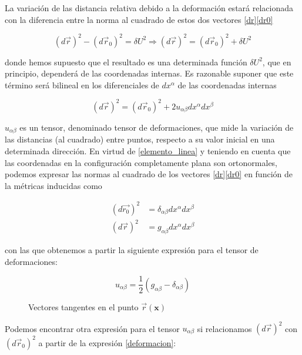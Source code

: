 La variación de las distancia relativa debido a la deformación estará
relacionada con la diferencia entre la norma al cuadrado de estos dos vectores
\eqref{dr}\eqref{dr0}

\begin{equation}
(d\vec{r})^2-(d\vec{r}_0)^2=\delta U^2\Rightarrow (d\vec{r})^2=(d\vec{r}_0)^2+\delta U^2
\end{equation}
 
donde hemos supuesto que el resultado es una determinada función $\delta U^2$,
que en principio, dependerá de las coordenadas internas. Es razonable suponer
que este término será bilineal en los diferenciales de $dx^{\alpha}$ de las
coordenadas internas 

\begin{equation}\label{drU}
(d\vec{r})^2=(d\vec{r}_0)^2+2u_{\alpha\beta}dx^{\alpha}dx^{\beta}
\end{equation}
 
$u_{\alpha\beta}$ es un tensor, denominado tensor de deformaciones, que mide
la variación de las distancias (al cuadrado) entre puntos, respecto a su valor
inicial en una determinada dirección. En virtud de \eqref{elemento_linea} y
teniendo en cuenta que las coordenadas en la configuración completamente plana
son ortonormales, podemos expresar las normas al cuadrado de los vectores
\eqref{dr}\eqref{dr0} en función de la métricas inducidas como

\begin{align*}
(d\vec{r_0})^2&=\delta_{\alpha\beta}dx^{\alpha}dx^{\beta}\\
(d\vec{r})^2&=g_{\alpha\beta}dx^{\alpha}dx^{\beta}
\end{align*}

con las que obtenemos a partir \label{drU} la siguiente expresión para el
tensor de deformaciones:

\begin{equation}
u_{\alpha\beta}=\frac{1}{2}\left(g_{\alpha\beta} - \delta_{\alpha\beta}\right)
\end{equation}


\begin{figure}[h]
\centering
 
\caption{Vectores tangentes en el punto $\vec{r}(\mathbf{x})$}
\end{figure}

Podemos encontrar otra expresión para el tensor $u_{\alpha\beta}$ si
relacionamos $(d\vec{r})^2$ con $(d\vec{r}_0)^2$ a partir de
la expresión \eqref{deformacion}:

